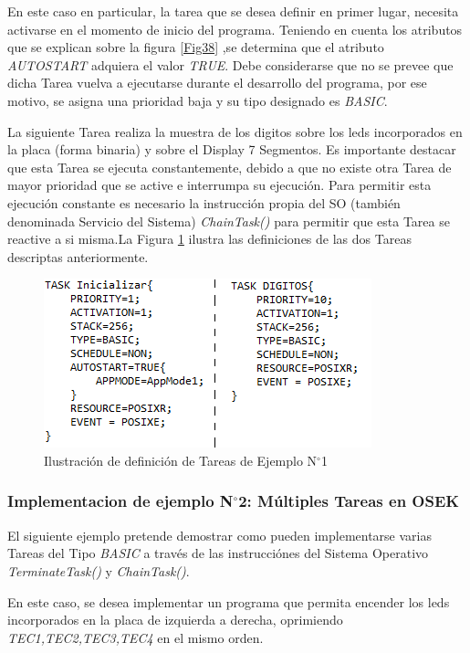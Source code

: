 \documentclass[12pt,letterpaper]{article}
\begin{document}
En este caso en particular, la tarea que se desea definir en primer lugar, necesita activarse en el momento de inicio del programa. Teniendo en cuenta los atributos que se explican sobre la figura \ref{Fig38} ,se determina que el atributo \textit{AUTOSTART} adquiera el valor \textit{TRUE}. Debe considerarse que no se prevee que dicha Tarea vuelva a ejecutarse durante el desarrollo del programa, por ese motivo, se asigna una prioridad baja y su tipo designado es \textit{BASIC}.

La siguiente Tarea realiza la muestra de los digitos sobre los leds incorporados en la placa (forma binaria) y sobre el Display 7 Segmentos. Es importante destacar que esta Tarea se ejecuta constantemente, debido a que no existe otra Tarea de mayor prioridad que se active e interrumpa su ejecución. Para permitir esta ejecución constante es necesario la instrucción propia del SO (también denominada Servicio del Sistema) \textit{ChainTask()} para permitir que esta Tarea se reactive a si misma.La Figura \ref{Fig39} ilustra las definiciones de las dos Tareas descriptas anteriormente.
\begin{figure}[!h]
\centering
\includegraphics[width=8 cm]{figuras/f22.png}
\caption{Ilustración de definición de Tareas de Ejemplo N$^{\circ}$1}
\label{Fig39}
\end{figure}

\subsubsection{Implementacion de ejemplo N$^{\circ}$2: Múltiples Tareas en OSEK}

El siguiente ejemplo pretende demostrar como pueden implementarse varias Tareas del Tipo \textit{BASIC} a través de las instrucciónes del Sistema Operativo \textit{TerminateTask()} y \textit{ChainTask()}.

En este caso, se desea implementar un programa que  permita encender los leds incorporados en la placa de izquierda a derecha, oprimiendo \textit{TEC1,TEC2,TEC3,TEC4} en el mismo orden.
\end{document}
